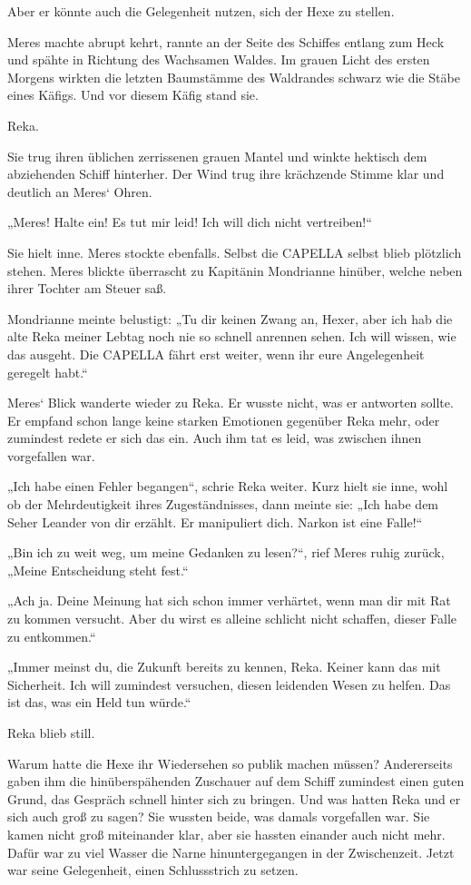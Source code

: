 \documentclass[10pt, a4paper, oneside]{book}
\begin{document}
Aber er könnte auch die Gelegenheit nutzen, sich der Hexe zu stellen.

Meres machte abrupt kehrt, rannte an der Seite des Schiffes entlang zum Heck und spähte in Richtung des Wachsamen Waldes. Im grauen Licht des ersten Morgens wirkten die letzten Baumstämme des Waldrandes schwarz wie die Stäbe eines Käfigs. Und vor diesem Käfig stand sie.

Reka.

Sie trug ihren üblichen zerrissenen grauen Mantel und winkte hektisch dem abziehenden Schiff hinterher. Der Wind trug ihre krächzende Stimme klar und deutlich an Meres‘ Ohren.

„Meres! Halte ein! Es tut mir leid! Ich will dich nicht vertreiben!“

Sie hielt inne. Meres stockte ebenfalls. Selbst die CAPELLA selbst blieb plötzlich stehen. Meres blickte überrascht zu Kapitänin Mondrianne hinüber, welche neben ihrer Tochter am Steuer saß.

Mondrianne meinte belustigt: „Tu dir keinen Zwang an, Hexer, aber ich hab die alte Reka meiner Lebtag noch nie so schnell anrennen sehen. Ich will wissen, wie das ausgeht. Die CAPELLA fährt erst weiter, wenn ihr eure Angelegenheit geregelt habt.“

Meres‘ Blick wanderte wieder zu Reka. Er wusste nicht, was er antworten sollte. Er empfand schon lange keine starken Emotionen gegenüber Reka mehr, oder zumindest redete er sich das ein. Auch ihm tat es leid, was zwischen ihnen vorgefallen war.

„Ich habe einen Fehler begangen“, schrie Reka weiter. Kurz hielt sie inne, wohl ob der Mehrdeutigkeit ihres Zugeständnisses, dann meinte sie: „Ich habe dem Seher Leander von dir erzählt. Er manipuliert dich. Narkon ist eine Falle!“

„Bin ich zu weit weg, um meine Gedanken zu lesen?“, rief Meres ruhig zurück, „Meine Entscheidung steht fest.“

„Ach ja. Deine Meinung hat sich schon immer verhärtet, wenn man dir mit Rat zu kommen versucht. Aber du wirst es alleine schlicht nicht schaffen, dieser Falle zu entkommen.“

„Immer meinst du, die Zukunft bereits zu kennen, Reka. Keiner kann das mit Sicherheit. Ich will zumindest versuchen, diesen leidenden Wesen zu helfen. Das ist das, was ein Held tun würde.“

Reka blieb still.

Warum hatte die Hexe ihr Wiedersehen so publik machen müssen? Andererseits gaben ihm die hinüberspähenden Zuschauer auf dem Schiff zumindest einen guten Grund, das Gespräch schnell hinter sich zu bringen. Und was hatten Reka und er sich auch groß zu sagen? Sie wussten beide, was damals vorgefallen war. Sie kamen nicht groß miteinander klar, aber sie hassten einander auch nicht mehr. Dafür war zu viel Wasser die Narne hinuntergegangen in der Zwischenzeit. Jetzt war seine Gelegenheit, einen Schlussstrich zu setzen.
\end{document}
